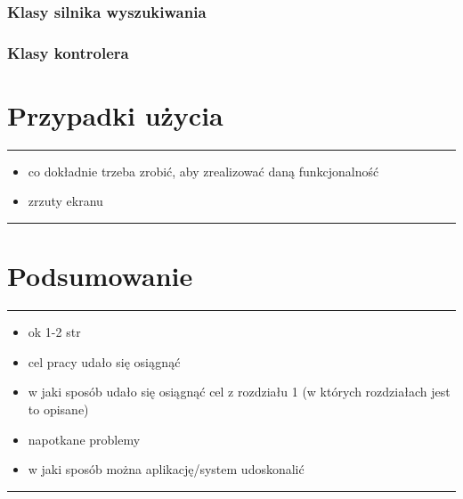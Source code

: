 \documentclass[licencjacka]{pracadypl}
\theoremstyle{definition}
\newcommand{\linia}{\rule{\linewidth}{0.4mm}}
\begin{document}
\subsection{Klasy silnika wyszukiwania}
\subsection{Klasy kontrolera}


\chapter{Przypadki użycia}
\linia
\begin{itemize}
	\item co dokładnie trzeba zrobić, aby zrealizować daną funkcjonalność
	\item zrzuty ekranu
\end{itemize}
\linia

\chapter{Podsumowanie}
\linia
\begin{itemize}
	\item ok 1-2 str
	\item cel pracy udało się osiągnąć
	\item w jaki sposób udało się osiągnąć cel z rozdziału 1 (w których rozdziałach jest to opisane)
	\item napotkane problemy
	\item w jaki sposób można aplikację/system udoskonalić
\end{itemize}

\linia
\cite{google-power-searching}

 

	
	
\end{document}
